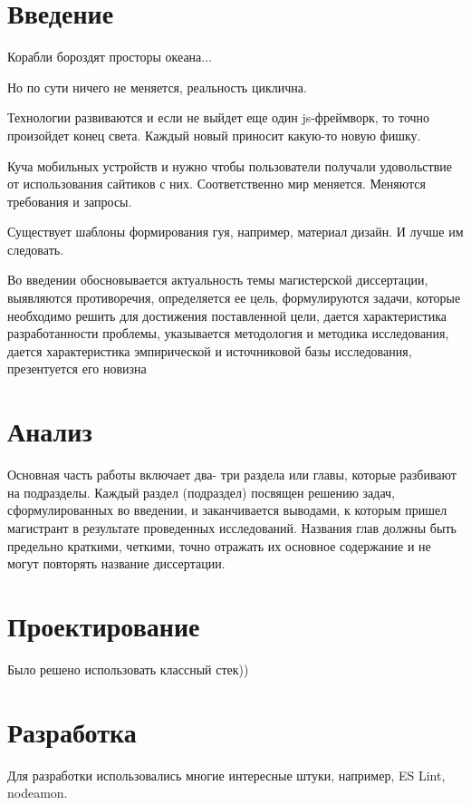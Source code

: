 



%

\section{Введение}
	Корабли бороздят просторы океана...
	
	Но по сути ничего не меняется, реальность циклична.

	Технологии развиваются и если не выйдет еще один js-фреймворк, то
	точно произойдет конец света. Каждый новый приносит какую-то
	новую фишку.

	Куча мобильных устройств и нужно чтобы пользователи получали удовольствие
	от использования сайтиков с них.
	Соответственно мир меняется. Меняются требования и запросы.

	Существует шаблоны формирования гуя, например, материал дизайн.
	И лучше им следовать.


	Во введении обосновывается актуальность темы магистерской диссертации,
	выявляются противоречия, определяется ее цель, формулируются задачи, которые
	необходимо решить для достижения поставленной цели, дается характеристика
	разработанности проблемы, указывается методология и методика исследования, дается
	характеристика эмпирической и источниковой базы исследования, презентуется его
	новизна

\section{Анализ}
	Основная часть работы включает два- три раздела или главы, которые
	разбивают на подразделы. Каждый раздел (подраздел) посвящен решению задач,
	сформулированных во введении, и заканчивается выводами, к которым пришел
	магистрант в результате проведенных исследований. Названия глав должны быть
	предельно краткими, четкими, точно отражать их основное содержание и не могут
	повторять название диссертации.

\section{Проектирование}
 	Было решено использовать классный стек))
 	
\section{Разработка}
	Для разработки использовались многие интересные штуки,
	например, ES Lint, nodeamon.

